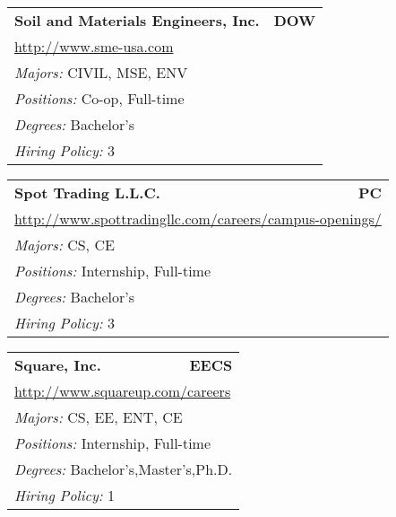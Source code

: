 \documentclass[twoside]{article}
\begin{document}
\begin{center}
\begin{multicols}{3}
\begin{FlushLeft}
\begin{minipage}{.9\columnwidth}
\end{minipage}
 
\begin{minipage}{.9\columnwidth}\begin{tabularx}{.95\columnwidth}{Xr}
                 {\Large\bf Soil and Materials Engineers, Inc.} & {\Large\bf DOW}\\
    \multicolumn{2}{p{.95\columnwidth}}{\url{http://www.sme-usa.com}}\\
    \multicolumn{2}{p{.95\columnwidth}}{\emph{Majors:} CIVIL, MSE, ENV}\\
    \multicolumn{2}{p{.95\columnwidth}}{\emph{Positions:} Co-op, Full-time}\\
    \multicolumn{2}{p{.95\columnwidth}}{\emph{Degrees:} Bachelor's}\\
    \multicolumn{2}{p{.95\columnwidth}}{\emph{Hiring Policy:} 3}\\
    \end{tabularx}
    
\end{minipage}
 
\begin{minipage}{.9\columnwidth}\begin{tabularx}{.95\columnwidth}{Xr}
                 {\Large\bf Spot Trading L.L.C.} & {\Large\bf PC}\\
    \multicolumn{2}{p{.95\columnwidth}}{\url{http://www.spottradingllc.com/careers/campus-openings/}}\\
    \multicolumn{2}{p{.95\columnwidth}}{\emph{Majors:} CS, CE}\\
    \multicolumn{2}{p{.95\columnwidth}}{\emph{Positions:} Internship, Full-time}\\
    \multicolumn{2}{p{.95\columnwidth}}{\emph{Degrees:} Bachelor's}\\
    \multicolumn{2}{p{.95\columnwidth}}{\emph{Hiring Policy:} 3}\\
    \end{tabularx}
    
\end{minipage}
 
\begin{minipage}{.9\columnwidth}\begin{tabularx}{.95\columnwidth}{Xr}
                 {\Large\bf Square, Inc.} & {\Large\bf EECS}\\
    \multicolumn{2}{p{.95\columnwidth}}{\url{http://www.squareup.com/careers}}\\
    \multicolumn{2}{p{.95\columnwidth}}{\emph{Majors:} CS, EE, ENT, CE}\\
    \multicolumn{2}{p{.95\columnwidth}}{\emph{Positions:} Internship, Full-time}\\
    \multicolumn{2}{p{.95\columnwidth}}{\emph{Degrees:} Bachelor's,Master's,Ph.D.}\\
    \multicolumn{2}{p{.95\columnwidth}}{\emph{Hiring Policy:} 1}\\
    \end{tabularx}
    

\end{minipage}
\end{FlushLeft}
\end{multicols}
\end{center}
\end{document}
